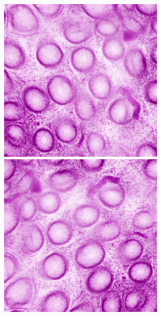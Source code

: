 \begin{figure}[H]
\begin{minipage}{0.24\columnwidth}
		\includegraphics[clip, width=\linewidth]{fig/preprocessing/data_aug/rotate/ROTATION_90}
		\subcaption{90\deg}
	\end{minipage}
	\begin{minipage}{0.24\columnwidth}
		\centering
		\includegraphics[clip, width=\linewidth]{fig/preprocessing/data_aug/rotate/ROTATION_180}

\end{minipage}
\end{figure}
